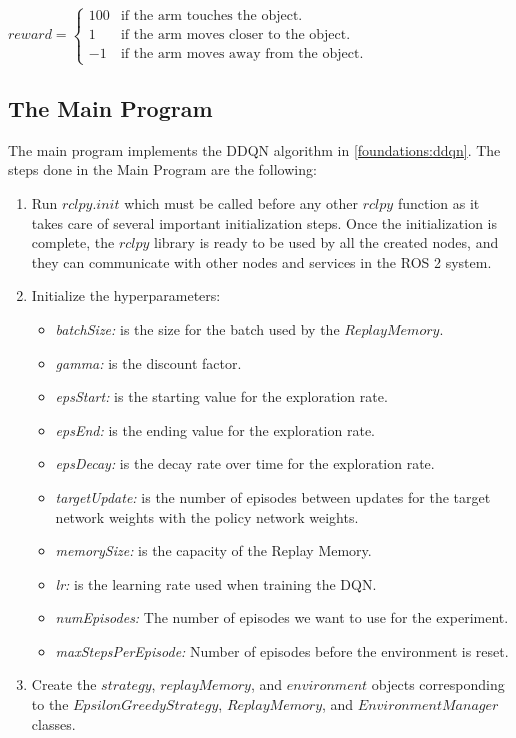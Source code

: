 \documentclass[12pt,oneside]{article}
\begin{document}
\begin{enumerate}
$reward = 
 \begin{cases} 
 	100 	& \text{if the arm touches the object.} \\ 
 	1 		& \text{if the arm moves closer to the object.} \\ 
 	-1 		& \text{if the arm moves away from the object.} 
 \end{cases}$
\end{enumerate}


\subsection{The Main Program}\label{main-program}
The main program implements the DDQN algorithm in \ref{foundations:ddqn}. The steps done in the Main Program are the following:
\begin{enumerate}
\item Run $rclpy.init$ which must be called before any other $rclpy$ function as it takes care of several important initialization steps. Once the initialization is complete, the $rclpy$ library is ready to be used by all the created nodes, and they can communicate with other nodes and services in the ROS 2 system.
\item  Initialize the hyperparameters:
\begin{itemize}
\item \textit{batchSize:} is the size for the batch used by the $ReplayMemory$.
\item \textit{gamma:} is the discount factor.
\item \textit{epsStart:} is the starting value for the exploration rate.
\item \textit{epsEnd: } is the ending value for the exploration rate.
\item \textit{epsDecay:} is the decay rate over time for the exploration rate.
\item \textit{targetUpdate:} is the number of episodes between updates for the target network weights with the policy network weights.
\item \textit{memorySize:} is the capacity of the Replay Memory.
\item \textit{lr:} is the learning rate used when training the DQN.
\item \textit{numEpisodes:} The number of episodes we want to use for the experiment.
\item \textit{maxStepsPerEpisode:} Number of episodes before the environment is reset.
\end{itemize}
\item Create the $strategy$, $replayMemory$, and $environment$ objects corresponding to the $EpsilonGreedyStrategy$, $ReplayMemory$, and $EnvironmentManager$ classes.

\end{enumerate}
\end{document}
